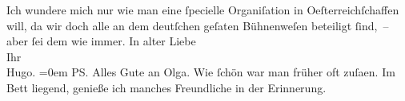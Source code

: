\begin{ledgroupsized}[t]{13cm}
           \pstart
           Ich wundere mich nur wie man eine ſpecielle Organiſation in Oeſterreichſchaffen will, da wir doch alle an dem
                    deutſchen geſa{\geminationm}ten Bühnenweſen beteiligt ſind, –
                    aber ſei dem wie immer.\pend
           \pstart
           In alter Liebe{\\[\baselineskip]}Ihr{\\[\baselineskip]}\spacefill\mbox{Hugo.}\pend
           \leftskip=0em{}\pstart
           \noindent{}\textsc{PS}. Alles Gute an Olga. Wie ſchön war man früher oft zuſa{\geminationm}en. Im Bett liegend, genieße ich manches
                        Freundliche in der Erinnerung.\pend
           \endnumbering{}\end{ledgroupsized}  \newcommand{\dateiname}{L02323}\newcommand{\titel}{Hugo Hofmannsthal an Arthur Schnitzler, 20. 4. 1919}\newcommand{\editorInnen}{Martin Anton Müller und Gerd-Hermann Susen}
            \footnotesize
\begin{ledgroupsized}[t]{11.5cm}
\end{ledgroupsized}
         
      
